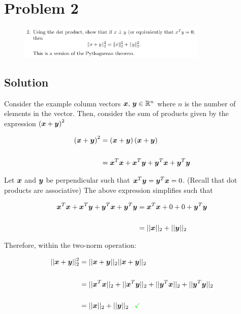 
\begingroup
\allowdisplaybreaks

\newpage
\section*{Problem 2}

\begin{figure}[h]
	\centering
	\includegraphics[width=0.8\textwidth]{./images/prob2_statement.png}
\end{figure}

\subsection*{Solution}

Consider the example column vectors $\boldsymbol{x},\,\boldsymbol{y} \in \mathbb{R}^{n}$ where $n$ is the number of elements in the vector. Then, consider the sum of products given by the expression $\left(\boldsymbol{x} + \boldsymbol{y}\right)^2$

\begin{align*}
	\left(\boldsymbol{x} + \boldsymbol{y}\right)^2 &= \left(\boldsymbol{x} + \boldsymbol{y}\right) \left(\boldsymbol{x} + \boldsymbol{y}\right) \\
	\\
	&= \boldsymbol{x}^T\boldsymbol{x} + \boldsymbol{x}^T\boldsymbol{y} + \boldsymbol{y}^T\boldsymbol{x} + \boldsymbol{y}^T\boldsymbol{y}
\end{align*}

Let $\boldsymbol{x}$ and $\boldsymbol{y}$ be perpendicular such that $\boldsymbol{x}^T\boldsymbol{y} = \boldsymbol{y}^T\boldsymbol{x} = 0$. (Recall that dot products are associative) The above expression simplifies such that

\begin{align*}
	\boldsymbol{x}^T\boldsymbol{x} + \boldsymbol{x}^T\boldsymbol{y} + \boldsymbol{y}^T\boldsymbol{x} + \boldsymbol{y}^T\boldsymbol{y} &= \boldsymbol{x}^T\boldsymbol{x} + 0 + 0 + \boldsymbol{y}^T\boldsymbol{y} \\
	\\
	&= || {\boldsymbol{x}} ||_2 + || {\boldsymbol{y}} ||_2 
\end{align*}

Therefore, within the two-norm operation:

\begin{align*}
	|| {\boldsymbol{x} + \boldsymbol{y}} ||_2^2 &= || {\boldsymbol{x} + \boldsymbol{y}} ||_2 || {\boldsymbol{x} + \boldsymbol{y}} ||_2 \\
	\\
	&= || {\boldsymbol{x}^T\boldsymbol{x}} ||_2 + || {\boldsymbol{x}^T\boldsymbol{y}} ||_2 + || {\boldsymbol{y}^T\boldsymbol{x}} ||_2 + || {\boldsymbol{y}^T\boldsymbol{y}} ||_2 \\
	\\
	&= || {\boldsymbol{x}} ||_2 + || {\boldsymbol{y}} ||_2 \,\,\,\,\, \textcolor{green}{\checkmark}
\end{align*}